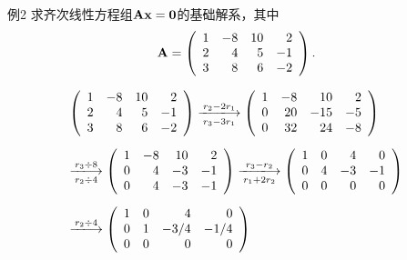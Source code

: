 \begin{frame}
  \begin{footnotesize}
    \begin{exampleblock}{例2}
      求齐次线性方程组$\mathbf{A}\mathbf{x}=\mathbf{0}$的基础解系，其中
      $$
      \mathbf{A} = \left(
      \begin{array}{rrrr}
        1&-8&10&2\\
        2&4&5&-1\\
        3&8&6&-2
      \end{array}
      \right).
      $$
    \end{exampleblock}
    \pause
    \jiename
    $$
    \begin{array}{l}
      \left(
      \begin{array}{rrrr}
        1&-8&10&2\\
        2&4&5&-1\\
        3&8&6&-2
      \end{array}
      \right) \xlongrightarrow[r_3-3r_1]{r_2-2r_1}
      \left(
      \begin{array}{rrrr}
        1&-8&10&2\\
        0&20&-15&-5\\
        0&32&24&-8
      \end{array}
      \right)\\[0.3in]
      \xlongrightarrow[r_2\div4]{r_3\div8}
      \left(
      \begin{array}{rrrr}
        1&-8&10&2\\
        0&4&-3&-1\\
        0&4&-3&-1
      \end{array}
      \right) \xlongrightarrow[r_1+2r_2]{r_3-r_2}
      \left(
      \begin{array}{rrrr}
        1&0&4&0\\
        0&4&-3&-1\\
        0&0&0&0
      \end{array}
      \right) \\[0.3in]
      \xlongrightarrow[]{r_2\div4}
      \left(
      \begin{array}{rrrr}
        1&0&4&0\\
        0&1&-3/4&-1/4\\
        0&0&0&0
      \end{array}
      \right)
    \end{array}
    $$
  \end{footnotesize}
\end{frame}

